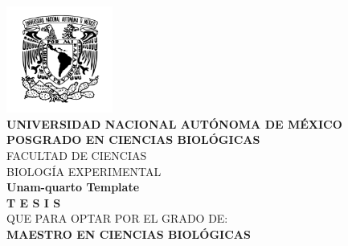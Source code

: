 \documentclass[
]{article}
\begin{document}

\pagestyle{plain} %


\begin{titlepage}
    \begin{center}
        \vspace*{-1.5cm} %
        
        \includegraphics[width=3.5cm]{ figuras/unam.png }\\[0.5cm]
        
        {\large \textbf{UNIVERSIDAD NACIONAL AUTÓNOMA DE MÉXICO}}\\[0.4cm]
        
        {\large \textbf{\MakeUppercase{Posgrado en Ciencias
Biológicas}}}\\[0.3cm]
        
        {\large \MakeUppercase{Facultad de Ciencias}}\\[0.2cm]
        {\large \MakeUppercase{Biología Experimental}}\\[1cm]
        
        {\Large \textbf{Unam-quarto Template}}\\[1cm]
        
        {\LARGE \textbf{T E S I S}}\\[0.5cm]
        
        {\large QUE PARA OPTAR POR EL GRADO DE:}\\[0.3cm]
        {\Large \textbf{MAESTRO EN CIENCIAS BIOLÓGICAS}}\\[1cm]
        

\end{center}
\end{titlepage}
\end{document}

